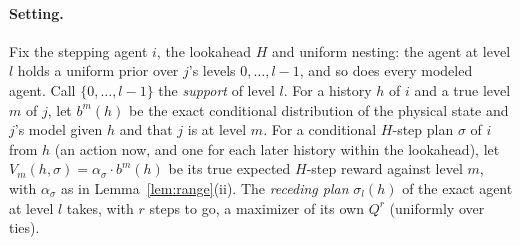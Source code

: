 \documentclass{article}
\begin{document}
\paragraph{Setting.} Fix the stepping agent $i$, the lookahead $H$ and uniform nesting: the agent at level $l$ holds a uniform prior over $j$'s levels $0, \ldots, l-1$, and so does every modeled agent. Call $\{0, \ldots, l-1\}$ the \emph{support} of level $l$. For a history $h$ of $i$ and a true level $m$ of $j$, let $b^m(h)$ be the exact conditional distribution of the physical state and $j$'s model given $h$ and that $j$ is at level $m$. For a conditional $H$-step plan $\sigma$ of $i$ from $h$ (an action now, and one for each later history within the lookahead), let $V_m(h, \sigma) = \alpha_\sigma \cdot b^m(h)$ be its true expected $H$-step reward against level $m$, with $\alpha_\sigma$ as in Lemma~\ref{lem:range}(ii). The \emph{receding plan} $\sigma_l(h)$ of the exact agent at level $l$ takes, with $r$ steps to go, a maximizer of its own $Q^r$ (uniformly over ties).
\end{document}
